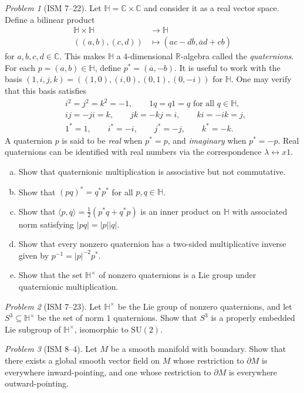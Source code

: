\documentclass[11pt,twoside]{amsart}
\theoremstyle{plain}
\theoremstyle{remark}
\newtheorem{prob}{Problem}
\theoremstyle{definition}
\theoremstyle{definition}
\newcommand{\RR}{\mathbb{R}}
\newcommand{\CC}{\mathbb{C}}
\newcommand{\HH}{\mathbb{H}}
\newcommand{\ol}{\overline}
\newcommand{\SU}{\mathrm{SU}}
\begin{document}
\begin{prob}[ISM 7--22]
Let $\HH=\CC\times \CC$ and consider it as a real vector space. Define a bilinear product
\[
\begin{aligned}
  \HH\times\HH&\longrightarrow \HH\\
  ((a,b),(c,d))&\longmapsto (ac-d\ol b,\ol ad+cb)
\end{aligned}
\]
for $a,b,c,d\in \CC$. This makes $\HH$ a $4$-dimensional $\RR$-algebra called the \emph{quaternions}. For each $p=(a,b)\in \HH$, define $p^* = (\ol a,-b)$. It is useful to work with the basis $(1,i,j,k) = ((1,0),(i,0),(0,1),(0,-i))$ for $\HH$. One may verify that this basis satisfies
\[
\begin{aligned}
&i^2=j^2=k^2=-1,\qquad 1q=q1=q\text{ for all }q\in \HH,\\
&ij=-ji=k,\qquad jk=-kj=i,\qquad ki=-ik=j,\\
&1^*=1,\qquad i^*=-i,\qquad j^*=-j,\qquad k^*=-k.
\end{aligned}
\]
A quaternion $p$ is said to be \emph{real} when $p^*=p$, and \emph{imaginary} when $p^*=-p$. Real quaternions can be identified with real numbers via the correspondence $\lambda \leftrightarrow x1$.
\begin{enumerate}[(a)]
\item Show that quaternionic multiplication is associative but not commutative.
\item Show that $(pq)^* = q^*p^*$ for all $p,q\in \HH$.
\item Show that $\langle p,q\rangle = \frac{1}{2}(p^*q+q^*p)$ is an inner product on $\HH$ with associated norm satisfying $|pq|=|p||q|$.
\item Show that every nonzero quaternion has a two-sided multiplicative inverse given by $p^{-1} = |p|^{-2}p^*$.
\item Show that the set $\HH^\times$ of nonzero quaternions is a Lie group under quaternionic multiplication.
\end{enumerate}
\end{prob}

\begin{prob}[ISM 7--23]
Let $\HH^\times$ be the Lie group of nonzero quaternions, and let $S^3\subseteq \HH^\times$ be the set of norm $1$ quaternions. Show that $S^3$ is a properly embedded Lie subgroup of $\HH^\times$, isomorphic to $\SU(2)$.
\end{prob}

\begin{prob}[ISM 8--4]
Let $M$ be a smooth manifold with boundary. Show that there exists a global smooth vector field on $M$ whose restriction to $\partial M$ is everywhere inward-pointing, and one whose restriction to $\partial M$ is everywhere outward-pointing.
\end{prob}
\end{document}

